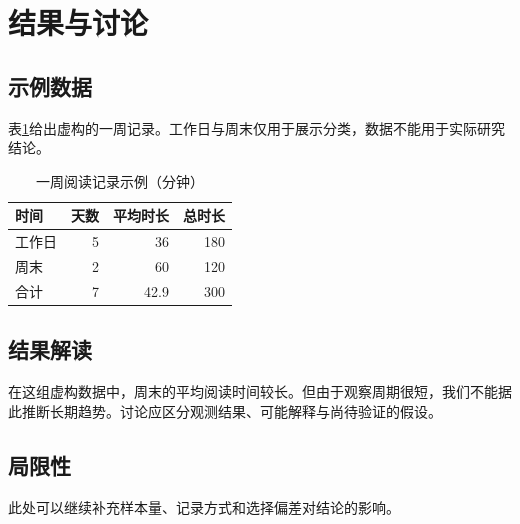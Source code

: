 \section{结果与讨论}\label{sec:results}
\subsection{示例数据}
表\ref{tab:reading}给出虚构的一周记录。工作日与周末仅用于展示分类，数据不能用于实际研究结论。
\begin{table}[htbp]
\centering
\caption{一周阅读记录示例（分钟）}\label{tab:reading}
\begin{tabular}{lrrr}
\toprule
时间 & 天数 & 平均时长 & 总时长 \\
\midrule
工作日 & 5 & 36 & 180 \\
周末 & 2 & 60 & 120 \\
合计 & 7 & 42.9 & 300 \\
\bottomrule
\end{tabular}
\end{table}
\subsection{结果解读}
在这组虚构数据中，周末的平均阅读时间较长。但由于观察周期很短，我们不能据此推断长期趋势。讨论应区分观测结果、可能解释与尚待验证的假设。
\subsection{局限性}
此处可以继续补充样本量、记录方式和选择偏差对结论的影响。
